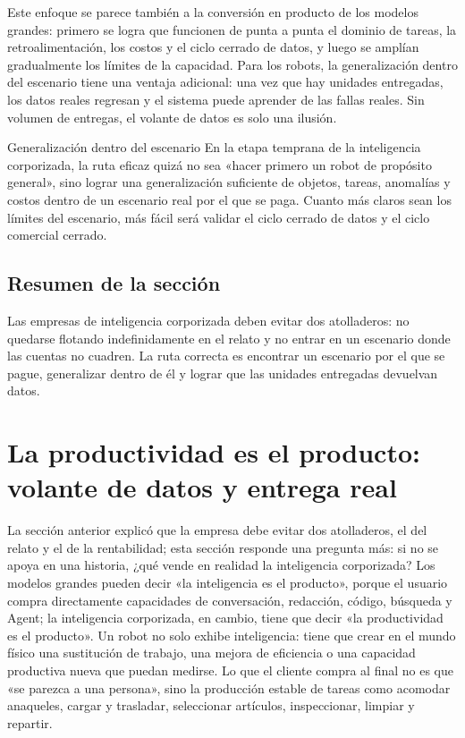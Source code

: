 \documentclass[a4paper]{article}
\begin{document}
Este enfoque se parece también a la conversión en producto de los modelos grandes: primero se logra que funcionen de punta a punta el dominio de tareas, la retroalimentación, los costos y el ciclo cerrado de datos, y luego se amplían gradualmente los límites de la capacidad. Para los robots, la generalización dentro del escenario tiene una ventaja adicional: una vez que hay unidades entregadas, los datos reales regresan y el sistema puede aprender de las fallas reales. Sin volumen de entregas, el volante de datos es solo una ilusión.

\begin{importantbox}{Generalización dentro del escenario}
En la etapa temprana de la inteligencia corporizada, la ruta eficaz quizá no sea «hacer primero un robot de propósito general», sino lograr una generalización suficiente de objetos, tareas, anomalías y costos dentro de un escenario real por el que se paga. Cuanto más claros sean los límites del escenario, más fácil será validar el ciclo cerrado de datos y el ciclo comercial cerrado.
\end{importantbox}

\subsection{Resumen de la sección}

Las empresas de inteligencia corporizada deben evitar dos atolladeros: no quedarse flotando indefinidamente en el relato y no entrar en un escenario donde las cuentas no cuadren. La ruta correcta es encontrar un escenario por el que se pague, generalizar dentro de él y lograr que las unidades entregadas devuelvan datos.
\section{La productividad es el producto: volante de datos y entrega real}

La sección anterior explicó que la empresa debe evitar dos atolladeros, el del relato y el de la rentabilidad; esta sección responde una pregunta más: si no se apoya en una historia, ¿qué vende en realidad la inteligencia corporizada? Los modelos grandes pueden decir «la inteligencia es el producto», porque el usuario compra directamente capacidades de conversación, redacción, código, búsqueda y Agent; la inteligencia corporizada, en cambio, tiene que decir «la productividad es el producto». Un robot no solo exhibe inteligencia: tiene que crear en el mundo físico una sustitución de trabajo, una mejora de eficiencia o una capacidad productiva nueva que puedan medirse. Lo que el cliente compra al final no es que «se parezca a una persona», sino la producción estable de tareas como acomodar anaqueles, cargar y trasladar, seleccionar artículos, inspeccionar, limpiar y repartir.
\end{document}
